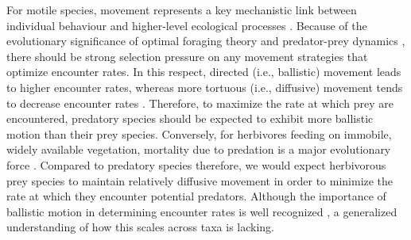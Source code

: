 \documentclass[12pt]{article}
\begin{document}
For motile species, movement represents a key mechanistic link between individual behaviour and higher-level ecological processes \cite{Holling:1959,Kareiva:1987,Huston:1988,Turchin:1998td,Barraquand:2013,Spiegel:2017be,Dougherty:2018}. Because of the evolutionary significance of optimal foraging theory \cite{Charnov:1976wz,Pyke:1984,DeKnegt:2007bg,Fagan:2013gx} and predator-prey dynamics \cite{Volterra:1928,Elton:1942,Mitchell:2002en,Fortin:2005fj,Barraquand:2013}, there should be strong selection pressure on any movement strategies that optimize encounter rates. In this respect, directed (i.e., ballistic) movement leads to higher encounter rates, whereas more tortuous (i.e., diffusive) movement tends to decrease encounter rates \cite{Gerritsen:1977,Visser:2006,Hutchinson:2007,Bartumeus:2008,Gurarie:2011ic}. Therefore, to maximize the rate at which prey are encountered, predatory species should be expected to exhibit more ballistic motion than their prey species. Conversely, for herbivores feeding on immobile, widely available vegetation, mortality due to predation is a major evolutionary force \cite{McNaughton:1986, Reale:2003, Sinclair:2003}. Compared to predatory species therefore, we would expect herbivorous prey species to maintain relatively diffusive movement in order to minimize the rate at which they encounter potential predators. Although the importance of ballistic motion in determining encounter rates is well recognized \cite{Visser:2006, Bartumeus:2008, Barraquand:2013, Gurarie:2013}, a generalized understanding of how this scales across taxa is lacking. 
\end{document}
